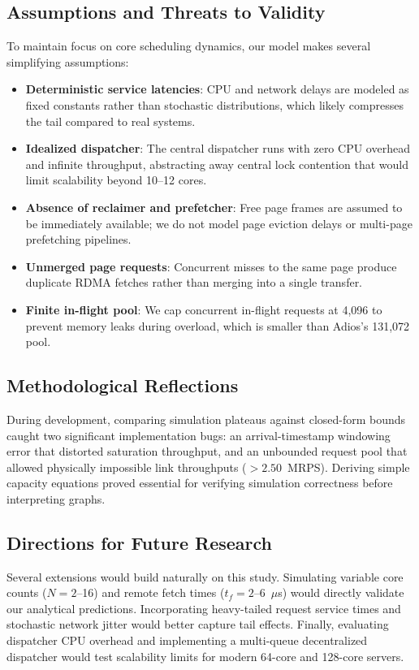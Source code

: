 \subsection{Assumptions and Threats to Validity}
To maintain focus on core scheduling dynamics, our model makes several simplifying assumptions:
\begin{itemize}
\item \textbf{Deterministic service latencies}: CPU and network delays are modeled as fixed constants rather than stochastic distributions, which likely compresses the tail compared to real systems.
\item \textbf{Idealized dispatcher}: The central dispatcher runs with zero CPU overhead and infinite throughput, abstracting away central lock contention that would limit scalability beyond 10--12 cores.
\item \textbf{Absence of reclaimer and prefetcher}: Free page frames are assumed to be immediately available; we do not model page eviction delays or multi-page prefetching pipelines.
\item \textbf{Unmerged page requests}: Concurrent misses to the same page produce duplicate RDMA fetches rather than merging into a single transfer.
\item \textbf{Finite in-flight pool}: We cap concurrent in-flight requests at 4,096 to prevent memory leaks during overload, which is smaller than Adios's 131,072 pool.
\end{itemize}

\subsection{Methodological Reflections}
During development, comparing simulation plateaus against closed-form bounds caught two significant implementation bugs: an arrival-timestamp windowing error that distorted saturation throughput, and an unbounded request pool that allowed physically impossible link throughputs ($>2.50$~MRPS). Deriving simple capacity equations proved essential for verifying simulation correctness before interpreting graphs.

\subsection{Directions for Future Research}
Several extensions would build naturally on this study. Simulating variable core counts ($N = 2$--16) and remote fetch times ($t_f = 2$--6~$\mu$s) would directly validate our analytical predictions. Incorporating heavy-tailed request service times and stochastic network jitter would better capture tail effects. Finally, evaluating dispatcher CPU overhead and implementing a multi-queue decentralized dispatcher would test scalability limits for modern 64-core and 128-core servers.
